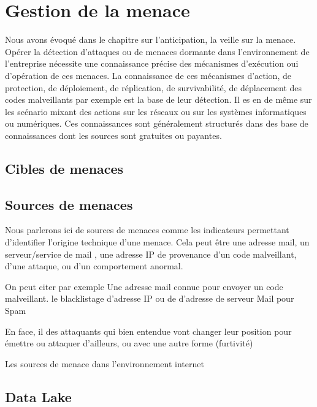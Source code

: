 


\section{Gestion de la menace}

Nous avons évoqué dans le chapitre sur l'anticipation, la veille sur la menace. Opérer la détection d'attaques ou de menaces dormante dans l'environnement de l'entreprise nécessite une connaissance précise des mécanismes d'exécution oui d'opération de ces menaces.
La connaissance de ces mécanismes  d'action, de protection, de déploiement, de réplication, de survivabilité, de déplacement des codes malveillants par exemple est la base de leur détection. Il es en de même sur les scénario mixant des actions sur les réseaux ou sur les systèmes informatiques ou numériques.
Ces connaissances sont généralement structurés dans des base de connaissances dont les sources sont gratuites ou payantes.


\subsection{Cibles de menaces}

\subsection{Sources de menaces}
Nous parlerons ici de sources de menaces comme les indicateurs permettant d'identifier l'origine technique d'une menace. Cela peut être une adresse mail, un serveur/service de mail , une adresse IP de provenance d'un code malveillant, d'une attaque, ou d'un comportement anormal.

On peut citer par exemple 
Une adresse mail connue pour envoyer un code malveillant.
le blacklistage d'adresse IP ou de d'adresse de serveur Mail pour Spam


En face, il des attaquants qui bien entendue vont changer leur position pour émettre ou attaquer d'ailleurs, ou avec une autre forme (furtivité)



Les sources de menace dans l'environnement internet			


\subsection{Data Lake}



